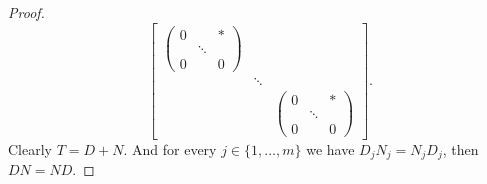 \begin{proof}
$$\begin{bmatrix}
\begin{pmatrix}
            0 & & \ast \\
            & \ddots & \\
            0 & & 0
        \end{pmatrix}
        & & \\
        &         \ddots & \\
        & &         \begin{pmatrix}
            0 & & \ast \\
            & \ddots & \\
            0 & & 0
        \end{pmatrix}
    \end{bmatrix}.$$
    Clearly $T = D + N$. And for every $j \in \{1, \dots, m\}$ we have $D_j N_j = N_j D_j$, then $DN = ND$.
\end{proof}